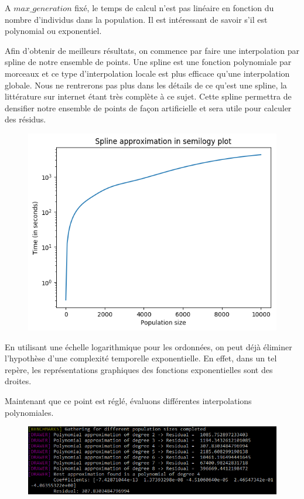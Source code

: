 A $max\_generation$ fixé, le temps de calcul n'est pas linéaire en fonction du nombre d'individus dans la population. Il est intéressant de savoir s'il est polynomial ou exponentiel.

Afin d'obtenir de meilleurs résultats, on commence par faire une interpolation par spline de notre ensemble de points. Une spline est une fonction polynomiale par morceaux et ce type d'interpolation locale est plus efficace qu'une interpolation globale. Nous ne rentrerons pas plus dans les détails de ce qu'est une spline, la littérature sur internet étant très complète à ce sujet. Cette spline permettra de densifier notre ensemble de points de façon artificielle et sera utile pour calculer des résidus.

\begin{figure}[!h]
    \centering
    \includegraphics[scale=0.9]{report/Pictures/setb4c9_expo_semilogy.png}
\end{figure}

En utilisant une échelle logarithmique pour les ordonnées, on peut déjà éliminer l'hypothèse d'une complexité temporelle exponentielle. En effet, dans un tel repère, les représentations graphiques des fonctions exponentielles sont des droites.

Maintenant que ce point est réglé, évaluons différentes interpolations polynomiales.

\begin{figure}[!h]
    \centering
    \includegraphics[width=\linewidth]{report/Pictures/setb4c9_approximation_result.png}
\end{figure}

